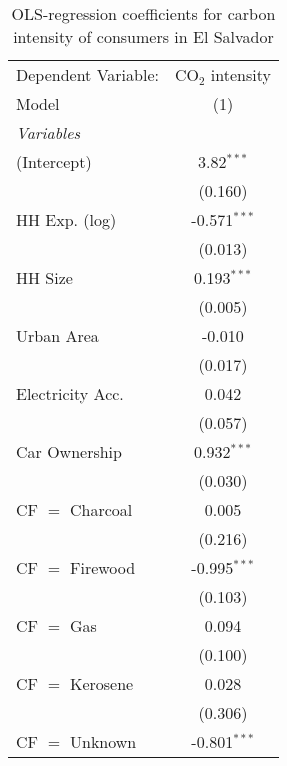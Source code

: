 
\begin{table}[htbp!]
   \centering
   \small
   \begin{adjustbox}{width = 1\textwidth, max height = 0.95\textheight, center}
      \begin{threeparttable}[b]
         \caption{\label{tab:OLS_1_SLV} OLS-regression coefficients for carbon intensity of consumers in El Salvador}
         \begin{tabular}{lc}
            \tabularnewline \midrule \midrule
            Dependent Variable: & CO$_{2}$ intensity\\  
            Model               & (1)\\  
            \midrule
            \emph{Variables}\\
            (Intercept)         & 3.82$^{***}$\\   
                                & (0.160)\\   
            HH Exp. (log)       & -0.571$^{***}$\\   
                                & (0.013)\\   
            HH Size             & 0.193$^{***}$\\   
                                & (0.005)\\   
            Urban Area          & -0.010\\   
                                & (0.017)\\   
            Electricity Acc.    & 0.042\\   
                                & (0.057)\\   
            Car Ownership       & 0.932$^{***}$\\   
                                & (0.030)\\   
            CF $=$ Charcoal     & 0.005\\   
                                & (0.216)\\   
            CF $=$ Firewood     & -0.995$^{***}$\\   
                                & (0.103)\\   
            CF $=$ Gas          & 0.094\\   
                                & (0.100)\\   
            CF $=$ Kerosene     & 0.028\\   
                                & (0.306)\\   
            CF $=$ Unknown      & -0.801$^{***}$\\   

\end{tabular}
\end{threeparttable}
\end{adjustbox}
\end{table}
